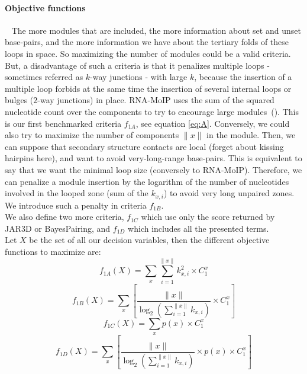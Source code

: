 \documentclass{bioinfo}
\begin{document}
\begin{methods}
\paragraph{Objective functions} ~ The more modules that are included, the more information about set and unset base-pairs, and the more information we have about the tertiary folds of these loops in space. So maximizing the number of modules could be a valid criteria. But, a disadvantage of such a criteria is that it penalizes multiple loops - sometimes referred as $k$-way junctions - with large $k$, because the insertion of a multiple loop forbids at the same time the insertion of several internal loops or bulges ($2$-way junctions) in place. RNA-MoIP uses the sum of the squared nucleotide count over the components to try to encourage large modules~(\citealp{reinharz_towards_2012}). This is our first benchmarked criteria $f_{1A}$, see equation \ref{eq:A}. Conversely, we could also try to maximize the number of components $\|x\|$ in the module. Then, we can suppose that secondary structure contacts are local (forget about kissing hairpins here), and want to avoid very-long-range base-pairs. This is equivalent to say that we want the minimal loop size (conversely to RNA-MoIP). Therefore, we can penalize a module insertion by the logarithm of the number of nucleotides involved in the looped zone (sum of the $k_{x,i}$) to avoid very long unpaired zones. We introduce such a penalty in criteria $f_{1B}$.\\ We also define two more criteria, $f_{1C}$ which use only the score returned by JAR3D or BayesPairing, and $f_{1D}$ which includes all the presented terms.\\
Let $X$ be the set of all our decision variables, then the different objective functions to maximize are:
\begin{equation} f_{1A}(X) = \sum_{x} \sum_{i=1}^{\|x\|} k_{x,i}^2 \times C^x_1\label{eq:A}\end{equation}
\begin{equation}f_{1B}(X) = \sum_{x} \left[ \frac{\|x\|}{\log_2(\sum_{i=1}^{\|x\|}k_{x,i})} \times C^x_1 \right] \label{eq:B}\end{equation}
\begin{equation} f_{1C}(X) = \sum_{x} p(x) \times C^x_1 \label{eq:C}\end{equation}
\begin{equation}f_{1D}(X) = \sum_{x} \left[ \frac{\|x\|}{\log_2(\sum_{i=1}^{\|x\|}k_{x,i})} \times p(x) \times C^x_1 \right]\label{eq:D}\end{equation}


\end{methods}
\end{document}
